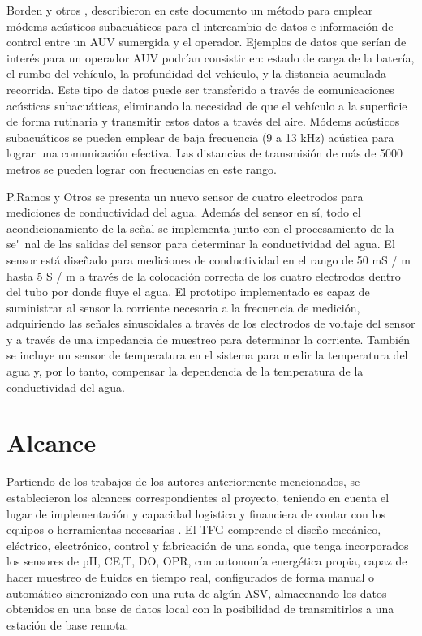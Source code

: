 Borden  y otros \cite{borden2012long},  describieron en este documento un m\'etodo para emplear m\'odems ac\'usticos subacu\'aticos para el intercambio de datos e informaci\'on  de control entre un AUV sumergida y el operador. Ejemplos de datos que ser\'ian de  inter\'es para un operador AUV podr\'ian consistir en: estado de carga de la bater\'ia, el rumbo del veh\'iculo, la profundidad del veh\'iculo, y la distancia acumulada recorrida. Este  tipo de datos puede ser transferido a través de comunicaciones acústicas subacu\'aticas, eliminando la  necesidad de que el veh\'iculo a la superficie de forma rutinaria y transmitir estos datos a trav\'es del aire. M\'odems ac\'usticos subacuáticos se pueden emplear de baja frecuencia (9 a 13 kHz) ac\'ustica para lograr  una comunicación efectiva. Las distancias de transmisi\'on de m\'as de 5000 metros se  pueden lograr con frecuencias en este rango.

 P.Ramos y Otros \cite{ramos2008four} se presenta un nuevo sensor de cuatro electrodos para mediciones de conductividad del agua. Adem\'as del sensor en s\'i, todo el acondicionamiento de la se\~nal se implementa junto con el procesamiento de la se\'~nal de las salidas del sensor para determinar la conductividad del agua. El sensor est\'a dise\~nado para mediciones de conductividad en el rango de 50 mS / m hasta 5 S / m a trav\'es de la colocaci\'on correcta de los cuatro electrodos dentro del tubo por donde fluye el agua. El prototipo implementado es capaz de suministrar al sensor la corriente necesaria a la frecuencia de medici\'on, adquiriendo las señales sinusoidales a trav\'es de los electrodos de voltaje del sensor y a trav\'es de una impedancia de muestreo para determinar la corriente. Tambi\'en se incluye un sensor de temperatura en el sistema para medir la temperatura del agua y, por lo tanto, compensar la dependencia de la temperatura de la conductividad del agua.

\section{Alcance}
Partiendo de los trabajos de los autores anteriormente mencionados, se establecieron los alcances correspondientes al proyecto, teniendo en cuenta el lugar de implementaci\'on y capacidad logistica y financiera de contar con los equipos o herramientas necesarias .
El TFG comprende el diseño mecánico, eléctrico, electrónico, control y fabricación de una sonda, que tenga incorporados los sensores de pH, CE,T, DO, OPR, con autonomía energética propia, capaz de hacer muestreo de fluidos en tiempo real, configurados de forma manual o automático sincronizado con una ruta de algún ASV, almacenando los datos obtenidos en una base de datos local con la posibilidad de transmitirlos a una estación de base remota. 

